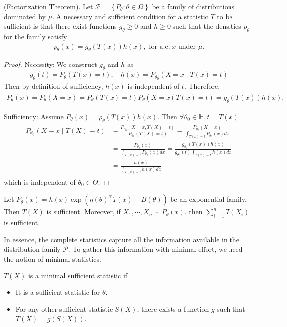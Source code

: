 \begin{thm}
    (Factorization Theorem). Let $\mathcal{P}=\left\{P_\theta: \theta \in \Omega\right\}$ be a family of distributions dominated by $\mu$. A necessary and sufficient condition for a statistic $T$ to be sufficient is that there exist functions $g_\theta \geq 0$ and $h \geq 0$ such that the densities $p_\theta$ for the family satisfy
\begin{align*}
p_\theta(x)=g_\theta(T(x)) h(x), \text { for a.e. } x \text { under } \mu .
\end{align*}
\end{thm}

\begin{proof}
    Necessity: We construct $g_\theta$ and $h$ as
\begin{align*}
g_\theta(t)=P_\theta(T(x)=t), \quad h(x)=P_{\theta_0}(X=x \mid T(x)=t)
\end{align*}
Then by definition of sufficiency, $h(x)$ is independent of $t$. Therefore,
\begin{align*}
P_\theta(x)=P_\theta(X=x)=P_\theta(T(x)=t) P_\theta\left(X=x(T(x)=t)=g_\theta(T(x)) h(x) .\right.
\end{align*}


Sufficiency: Assume $P_\theta(x)=\rho_\theta(T(x)) h(x)$. Then $\forall \theta_0 \in \mathbb{H}, t=T(x)$
\begin{align*}
\begin{aligned}
P_{\theta_0}(X=x \mid T(X)=t) & =\frac{P_{\theta_0}(X=x, T(X)=t)}{P_{\theta_0}(T(X)=t)}=\frac{P_{\theta_0}(X=x)}{\int_{T(x)=t} P_{\theta_0}(x) d x} \\
& =\frac{P_{\theta_0}(x)}{\int_{T(x)=t} P_{\theta_0}(x) d x}=\frac{g_{\theta_0}(T(x)) h(x)}{g_{\theta_0}(t) \int_{T(x)=t} h(x) d x} \\
& =\frac{h(x)}{\int_{T(x)=t} h(x) d x}
\end{aligned}
\end{align*}
which is independent of $\theta_0 \in \Theta$.
\end{proof}

\begin{eg}
    Let $P_\theta(x)=h(x) \exp \left(\eta(\theta)^{\top} T(x)-B(\theta)\right)$ be an exponential family. Then $T(X)$ is sufficient. Moreover, if $X_1, \cdots, X_n \sim P_\theta(x)$. then $\sum_{i=1}^n T\left(X_i\right)$ is sufficient.
\end{eg}

In essence, the complete statistics capture all the information available in the distribution family $\mathcal{P}$. To gather this information with minimal effort, we need the notion of minimal statistics.
\begin{de}
$T(X)$ is a minimal sufficient statistic if
\begin{itemize}
    \item It is a sufficient statistic for $\theta$.
    \item For any other sufficient statistic $S(X)$, there exists a function $g$ such that $T(X)= g(S(X))$.
\end{itemize}
\end{de}

